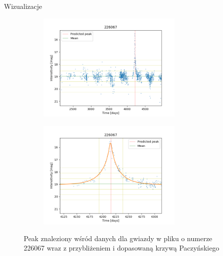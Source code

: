 \documentclass[a4paper,11pt]{article}
\begin{document}
\begin{subsection}{Wizualizacje}
\begin{figure}[H]
\end{figure}
\begin{figure}[H]
\begin{subfigure}{0.5\textwidth}
\centering
\includegraphics[width=\linewidth,height=5.25cm]{226067.png}
\label{Fig_12}
\end{subfigure}
\begin{subfigure}{0.5\textwidth}
\centering
\includegraphics[width=\linewidth,height=5.25cm]{226067_v.png}
\label{Fig_13}
\end{subfigure}
\caption{Peak znaleziony wśród danych dla gwiazdy w pliku o numerze 226067 wraz z przybliżeniem i dopasowaną krzywą Paczyńskiego}
\end{figure}
\end{subsection}

\end{document}
